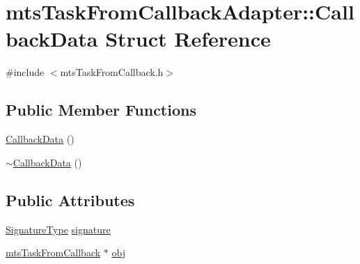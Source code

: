 \hypertarget{structmts_task_from_callback_adapter_1_1_callback_data}{\section{mts\-Task\-From\-Callback\-Adapter\-:\-:Callback\-Data Struct Reference}
\label{structmts_task_from_callback_adapter_1_1_callback_data}
}


{\ttfamily \#include $<$mts\-Task\-From\-Callback.\-h$>$}

\subsection*{Public Member Functions}
\begin{DoxyCompactItemize}
\item 
\hyperlink{structmts_task_from_callback_adapter_1_1_callback_data_abad12ea5eefed0f86f22da9db6cb5767}{Callback\-Data} ()
\item 
\hyperlink{structmts_task_from_callback_adapter_1_1_callback_data_a3aa4913d0ebd0dfd0065a65f6cf3945e}{$\sim$\-Callback\-Data} ()
\end{DoxyCompactItemize}
\subsection*{Public Attributes}
\begin{DoxyCompactItemize}
\item 
\hyperlink{classmts_task_from_callback_adapter_aa81f29d07e560c1b9f5a9f004e49df97}{Signature\-Type} \hyperlink{structmts_task_from_callback_adapter_1_1_callback_data_a657f9a6d041e0ba81dfb27a8610d6650}{signature}
\item 
\hyperlink{classmts_task_from_callback}{mts\-Task\-From\-Callback} $\ast$ \hyperlink{structmts_task_from_callback_adapter_1_1_callback_data_aac5b1768783a485fd26f702739f8e28e}{obj}
\end{DoxyCompactItemize}


